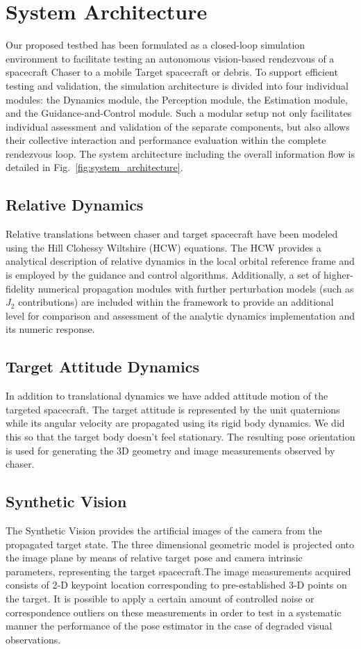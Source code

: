 \section{System Architecture}
Our proposed testbed has been formulated as a closed-loop simulation environment to facilitate testing an autonomous vision-based rendezvous of a spacecraft Chaser to a mobile Target spacecraft or debris. To support efficient testing and validation, the simulation architecture is divided into four individual modules: the Dynamics module, the Perception module, the Estimation module, and the Guidance-and-Control module. Such a modular setup not only facilitates individual assessment and validation of the separate components, but also allows their collective interaction and performance evaluation within the complete rendezvous loop. The system architecture including the overall information flow is detailed in Fig.~\ref{fig:system_architecture}.

\subsection{Relative Dynamics}
Relative translations between chaser and target spacecraft have been modeled using the Hill Clohessy Wiltshire (HCW) equations. The HCW provides a analytical description of relative dynamics in the local orbital reference frame and is employed by the guidance and control algorithms. Additionally, a set of higher-fidelity numerical propagation modules with further perturbation models (such as $J_2$ contributions) are included within the framework to provide an additional level for comparison and assessment of the analytic dynamics implementation and its numeric response.

\subsection{Target Attitude Dynamics}
In addition to translational dynamics we have added attitude motion of the targeted spacecraft. The target attitude is represented by the unit quaternions while its angular velocity are propagated using its rigid body dynamics. We did this so that the target body doesn't feel stationary. The resulting pose orientation is used for generating the 3D geometry and image measurements observed by chaser.

\subsection{Synthetic Vision}
The Synthetic Vision provides the artificial images of the camera from the propagated target state. The three dimensional geometric model is projected onto the image plane by means of relative target pose and camera intrinsic parameters, representing the target spacecraft.The image measurements acquired consists of 2-D keypoint location corresponding to pre-established 3-D points on the target. It is possible to apply a certain amount of controlled noise or correspondence outliers on these measurements in order to test in a systematic manner the performance of the pose estimator in the case of degraded visual observations.

